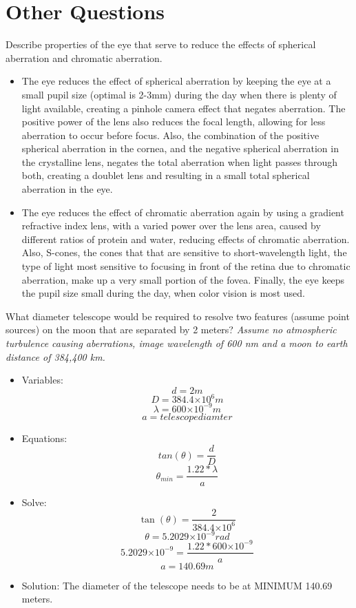 \documentclass{article}
\providecommand{\e}[1]{\ensuremath{\times 10^{#1}}}
\begin{document}
\section{Other Questions}
\begin{enumerate}[1.]
\begin{item}
Describe properties of the eye that serve to reduce the effects of spherical aberration and chromatic aberration.\
\begin{itemize}
\item The eye reduces the effect of spherical aberration by keeping the eye at a small pupil size (optimal is 2-3mm) during the day when there is plenty of light available, creating a pinhole camera effect that negates aberration. The positive power of the lens also reduces the focal length, allowing for less aberration to occur before focus. Also, the combination of the positive spherical aberration in the cornea, and the negative spherical aberration in the crystalline lens, negates the total aberration when light passes through both, creating a doublet lens and resulting in a small total spherical aberration in the eye. 

\item The eye reduces the effect of chromatic aberration again by using a gradient refractive index lens, with a varied power over the lens area, caused by different ratios of protein and water, reducing effects of chromatic aberration. Also, S-cones, the cones that that are sensitive to short-wavelength light, the type of light most sensitive to focusing in front of the retina due to chromatic aberration, make up a very small portion of the fovea. Finally, the eye keeps the pupil size small during the day, when color vision is most used.

\end{itemize}

\end{item}
\begin{item}
What diameter telescope would be required to resolve two features (assume point sources) on the moon that are separated by 2 meters? \textit{Assume no atmospheric turbulence causing aberrations, image wavelength of 600 nm and a moon to earth distance of 384,400 km.}
\begin{itemize}
\item Variables:
$$d = 2m $$
$$D = 384.4\e6 m$$
$$ \lambda = 600\e{-9} m$$
$$ a = telescope diamter $$
\item Equations:
$$tan(\theta) = \frac{d}{D} $$
$$\theta_{min} = \frac{1.22*\lambda}{a} $$
\item Solve:
$$\tan(\theta) = \frac{2}{384.4\e{6}} $$
$$\theta = 5.2029\e{-9}rad $$
$$5.2029\e{-9} = \frac{1.22*600\e{-9}}{a}$$
$$a = 140.69m $$
\item Solution: The diameter of the telescope needs to be at MINIMUM 140.69 meters.
\end{itemize}


\end{item}
\end{enumerate}
\end{document}
